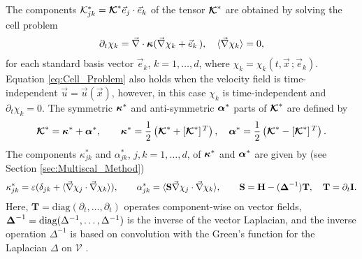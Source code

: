\documentclass[11pt]{amsart}
\newcommand{\Tb}{\mathbf{T}}
\newcommand{\Hb}{\mathbf{H}}
\newcommand{\Ib}{\mathbf{I}}
\newcommand{\Sb}{\mathbf{S}}
\newcommand{\Kc}{\mathcal{K}}
\newcommand\Kbc{\mbox{\boldmath${\mathcal{K}}$}}
\newcommand{\Vc}{\mathcal{V}}
\newcommand\balpha{\mbox{\boldmath${\alpha}$}}
\newcommand\bDelta{\mbox{\boldmath${\Delta}$}}
\newcommand\bkappa{\mbox{\boldmath${\kappa}$}}
\begin{document}
The components $\Kc^*_{jk}=\Kbc^*\vec{e}_j\cdot\vec{e}_k$ of the tensor
$\Kbc^*$ are obtained by solving the cell problem
\cite{Fannjiang:SIAM_JAM:333} 
% 
\begin{align}\label{eq:Cell_Problem}
  \partial_t\chi_k=\vec{\nabla}\cdot\bkappa(\vec{\nabla}\chi_k+\vec{e}_k\,), \quad
  \langle\vec{\nabla}\chi_k\rangle=0,
\end{align}
%
for each standard basis vector $\vec{e}_k$, $k=1,\ldots,d$, where
$\chi_k=\chi_k(t,\vec{x}\,;\vec{e}_k)$. Equation \eqref{eq:Cell_Problem}
also holds \cite{Fannjiang:SIAM_JAM:333} when the velocity field is
time-independent $\vec{u}=\vec{u}(\vec{x})$, however, in this case
$\chi_k$ is time-independent and $\partial_t\chi_k=0$. The symmetric $\bkappa^*$ and
anti-symmetric $\balpha^*$ parts of $\Kbc^*$ are defined by
%
\begin{align}\label{eq:Symm_Anti-Symm}
  \Kbc^*=\bkappa^*+\balpha^*,\qquad
  \bkappa^*=\frac{1}{2}\left(\Kbc^*+[\Kbc^*]^{\,T}\right), \quad
  \balpha^*=\frac{1}{2}\left(\Kbc^*-[\Kbc^*]^{\,T}\right).
\end{align}
%
The components $\kappa^*_{jk}$ and $\alpha^*_{jk}$, $j,k=1,\ldots,d$, of $\bkappa^*$
and $\balpha^*$ are given by (see Section \ref{sec:Multiscal_Method}) 
%
\begin{align}\label{eq:Eff_Diffusivity}
 \kappa^*_{jk}=\varepsilon(\delta_{jk}+\langle\vec{\nabla}\chi_j\cdot\vec{\nabla}\chi_k\rangle), \qquad
 \alpha^*_{jk}=\langle\Sb\vec{\nabla}\chi_j\cdot\vec{\nabla}\chi_k\rangle, \qquad
 \Sb=\Hb-(\bDelta^{-1})\Tb, \quad \Tb=\partial_t\Ib.
\end{align}
%
Here, $\Tb=\text{diag}(\partial_t,\ldots,\partial_t)$ operates component-wise on vector
fields, $\bDelta^{-1}=\text{diag}(\Delta^{-1},\ldots,\Delta^{-1})$ is the inverse of
the vector Laplacian, and the inverse operation $\Delta^{-1}$ is based on
convolution with the Green's function for the Laplacian $\Delta$ on $\Vc$
\cite{Stakgold:BVP:2000}.
\end{document}

